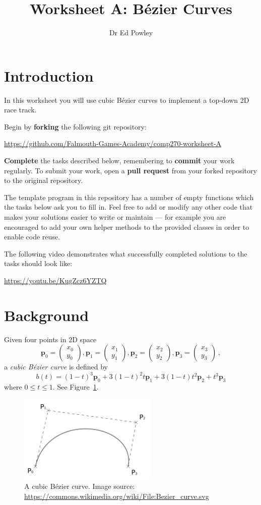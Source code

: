 \documentclass{../../../fal_assignment}
\title{Worksheet A: B\'ezier Curves}
\author{Dr Ed Powley}
\newcommand{\colvec}[2]{\begin{pmatrix}#1\\#2\end{pmatrix}}
\newcommand{\colxy}[1]{\colvec{x_{#1}}{y_{#1}}}
\begin{document}
\maketitle

\section*{Introduction}

In this worksheet you will use cubic B\'ezier curves to implement a top-down 2D race track.

Begin by \textbf{forking} the following git repository:

\begin{center}
	\url{https://github.com/Falmouth-Games-Academy/comp270-worksheet-A}
\end{center}

\textbf{Complete} the tasks described below, remembering to \textbf{commit} your work regularly.
To submit your work, open a \textbf{pull request} from your forked repository to the original repository.

The template program in this repository has a number of empty functions which the tasks below ask you to fill in. Feel free to add or modify any other code that makes your solutions easier to write or maintain ---
for example you are encouraged to add your own helper methods to the provided classes in order to enable code reuse.

The following video demonstrates what successfully completed solutions to the tasks should look like:

\begin{center}
	\url{https://youtu.be/KugZcz6YZTQ}
\end{center}

\section*{Background}

Given four points in 2D space
$$ \mathbf{p}_0 = \colxy0, \mathbf{p}_1 = \colxy1, \mathbf{p}_2 = \colxy2, \mathbf{p}_3 = \colxy3 \,, $$
a \emph{cubic B\'ezier curve} is defined by
$$ b(t) = (1-t)^3 \mathbf{p}_0 + 3(1-t)^2t \mathbf{p}_1 + 3(1-t)t^2 \mathbf{p}_2 + t^3 \mathbf{p}_3 $$
where $0 \leq t \leq 1$. See Figure~\ref{fig:bezier}.

\begin{figure}[ht]
	\begin{center}
		\includegraphics[width=0.6\textwidth]{bezier}
	\end{center}
	\caption{A cubic B\'ezier curve. Image source: \protect\url{https://commons.wikimedia.org/wiki/File:Bezier_curve.svg}}
	\label{fig:bezier}
\end{figure}
\end{document}
